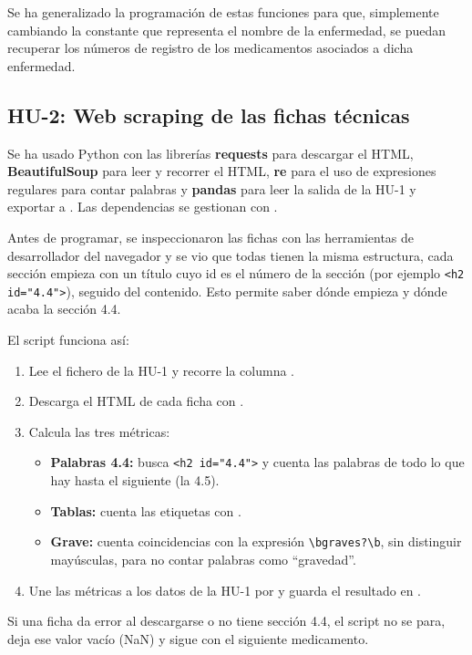 \documentclass[11pt,a4paper]{article}
\begin{document}
Se ha generalizado la programación de estas funciones para que, simplemente cambiando la
constante que representa el nombre de la enfermedad, se puedan recuperar los números de
registro de los medicamentos asociados a dicha enfermedad.

\subsection{HU-2: Web scraping de las fichas técnicas}
Se ha usado Python con las librerías \textbf{requests} para descargar el HTML, \textbf{BeautifulSoup} para leer y
recorrer el HTML, \textbf{re} para el uso de expresiones regulares para contar palabras y \textbf{pandas} para leer la salida de la
HU-1 y exportar a . Las dependencias se gestionan con .

Antes de programar, se inspeccionaron las fichas con las herramientas de desarrollador del
navegador y se vio que todas tienen la misma estructura, cada sección empieza con un título
 cuyo id es el número de la sección (por ejemplo \texttt{<h2 id="4.4">}), seguido del contenido.
Esto permite saber dónde empieza y dónde acaba la sección 4.4.

El script funciona así:
\begin{enumerate}
  \item Lee el fichero de la HU-1 y recorre la columna .
  \item Descarga el HTML de cada ficha con .
  \item Calcula las tres métricas:
  \begin{itemize}
    \item \textbf{Palabras 4.4:} busca \texttt{<h2 id="4.4">} y cuenta las palabras de todo lo que hay hasta
          el siguiente  (la 4.5).
    \item \textbf{Tablas:} cuenta las etiquetas  con .
    \item \textbf{Grave:} cuenta coincidencias con la expresión \texttt{\textbackslash bgraves?\textbackslash b}, sin distinguir
          mayúsculas, para no contar palabras como ``gravedad''.
  \end{itemize}
  \item Une las métricas a los datos de la HU-1 por  y guarda el resultado en
        .
\end{enumerate}
Si una ficha da error al descargarse o no tiene sección 4.4, el script no se para, deja ese valor
vacío (NaN) y sigue con el siguiente medicamento.
\end{document}
